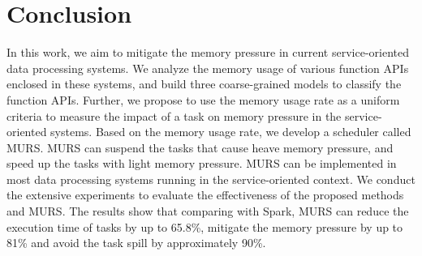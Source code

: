 \section{Conclusion}

In this work, we aim to mitigate the memory pressure in current service-oriented data processing systems. We analyze the memory usage of various function APIs enclosed in these systems, and build three coarse-grained models to classify the function APIs. Further, we propose to use the memory usage rate as a uniform criteria to measure the impact of a task on memory pressure in the service-oriented systems. Based on the memory usage rate, we develop a scheduler called MURS. MURS can suspend the tasks that cause heave memory pressure, and speed up the tasks with light memory pressure. MURS can be implemented in most data processing systems running in the service-oriented context. We conduct the extensive experiments to evaluate the effectiveness of the proposed methods and MURS. The results show that comparing with Spark, MURS can reduce the execution time of tasks by up to 65.8\%, mitigate the memory pressure by up to 81\% and avoid the task spill by approximately 90\%.